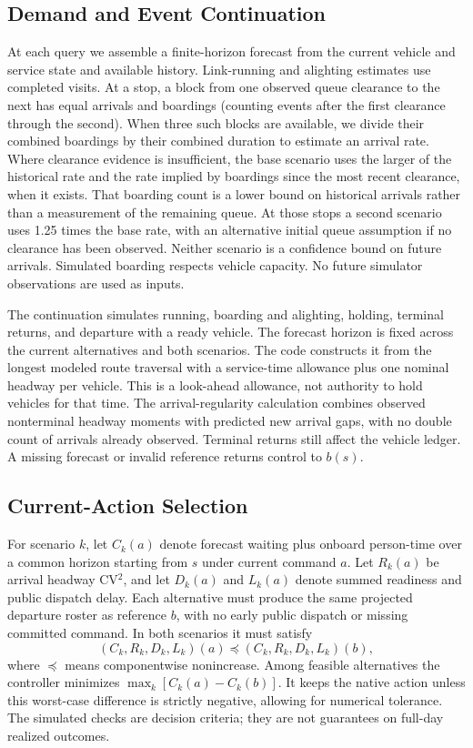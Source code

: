 \documentclass[journal]{IEEEtran}
\begin{document}
\subsection{Demand and Event Continuation}
At each query we assemble a finite-horizon forecast from the current vehicle and service state and available history. Link-running and alighting estimates use completed visits. At a stop, a block from one observed queue clearance to the next has equal arrivals and boardings (counting events after the first clearance through the second). When three such blocks are available, we divide their combined boardings by their combined duration to estimate an arrival rate. Where clearance evidence is insufficient, the base scenario uses the larger of the historical rate and the rate implied by boardings since the most recent clearance, when it exists. That boarding count is a lower bound on historical arrivals rather than a measurement of the remaining queue. At those stops a second scenario uses 1.25 times the base rate, with an alternative initial queue assumption if no clearance has been observed. Neither scenario is a confidence bound on future arrivals. Simulated boarding respects vehicle capacity. No future simulator observations are used as inputs.

The continuation simulates running, boarding and alighting, holding, terminal returns, and departure with a ready vehicle. The forecast horizon is fixed across the current alternatives and both scenarios. The code constructs it from the longest modeled route traversal with a service-time allowance plus one nominal headway per vehicle. This is a look-ahead allowance, not authority to hold vehicles for that time. The arrival-regularity calculation combines observed nonterminal headway moments with predicted new arrival gaps, with no double count of arrivals already observed. Terminal returns still affect the vehicle ledger. A missing forecast or invalid reference returns control to $b(s)$.

\subsection{Current-Action Selection}
For scenario $k$, let $C_k(a)$ denote forecast waiting plus onboard person-time over a common horizon starting from $s$ under current command $a$. Let $R_k(a)$ be arrival headway CV$^2$, and let $D_k(a)$ and $L_k(a)$ denote summed readiness and public dispatch delay. Each alternative must produce the same projected departure roster as reference $b$, with no early public dispatch or missing committed command. In both scenarios it must satisfy
\begin{equation}
  (C_k,R_k,D_k,L_k)(a) \preceq (C_k,R_k,D_k,L_k)(b),
\end{equation}
where $\preceq$ means componentwise nonincrease. Among feasible alternatives the controller minimizes $\max_k[C_k(a)-C_k(b)]$. It keeps the native action unless this worst-case difference is strictly negative, allowing for numerical tolerance. The simulated checks are decision criteria; they are not guarantees on full-day realized outcomes.
\end{document}
